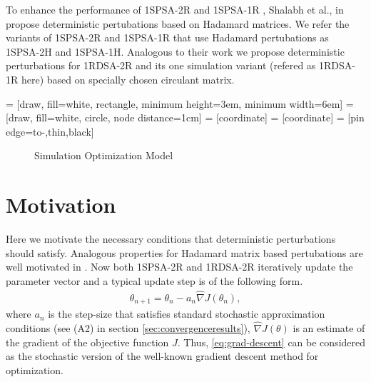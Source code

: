 \documentclass[letterpaper, 10 pt, conference]{ieeeconf}  %
\begin{document}
To enhance the performance of 1SPSA-2R and 1SPSA-1R , Shalabh et al., in
\cite{bhatnagar2003two} propose deterministic pertubations based on Hadamard matrices.
We refer the variants of 1SPSA-2R and 1SPSA-1R that use Hadamard pertubations as
1SPSA-2H and 1SPSA-1H. Analogous to their work we propose deterministic perturbations
for 1RDSA-2R and its  one simulation variant (refered as 1RDSA-1R here) based on 
specially chosen circulant matrix.

 = [draw, fill=white, rectangle,
   minimum height=3em, minimum width=6em]
 = [draw, fill=white, circle, node distance=1cm]
 = [coordinate]
 = [coordinate]
 = [pin edge={to-,thin,black}]

\begin{figure}[t]
    \centering
{}
\caption{Simulation Optimization Model}
\label{fig:so}
\end{figure}

\section{Motivation}
Here we motivate the necessary conditions that deterministic perturbations should satisfy.
Analogous properties for Hadamard matrix based pertubations are well motivated in 
\cite{bhatnagar-book}.
Now both 1SPSA-2R and 1RDSA-2R iteratively update the parameter vector and a typical update step
is of the following form.
\begin{align}
\label{eq:grad-descent}
\theta_{n+1} = \theta_n - a_n \widehat\nabla J(\theta_n), 
\end{align}
where $a_n$ is the step-size that satisfies standard stochastic approximation 
conditions (see (A2) in section \ref{sec:convergenceresults}), $\widehat\nabla 
J(\theta)$ is an estimate of the gradient of the objective function $J$.
Thus, \eqref{eq:grad-descent} can be considered as 
the stochastic version of the well-known gradient descent method for optimization. 
\end{document}
